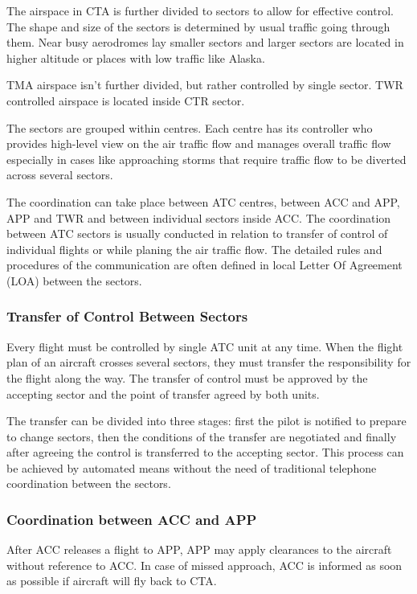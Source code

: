 The airspace in CTA is further divided to sectors to allow for effective control. The shape and size of the sectors is determined by usual traffic going through them. Near busy aerodromes lay smaller sectors and larger sectors are located in higher altitude or places with low traffic like Alaska.

TMA airspace isn't further divided, but rather controlled by single sector. TWR controlled airspace is located inside CTR sector. 

The sectors are grouped within centres. Each centre has its  controller who provides high-level view on the air traffic flow and manages overall traffic flow especially in cases like approaching storms that require traffic flow to be diverted across several sectors.

The coordination can take place between ATC centres, between ACC and APP, APP and TWR and between individual sectors inside ACC. The coordination between ATC sectors is usually conducted in relation to transfer of control of individual flights or while planing the air traffic flow. The detailed rules and procedures of the communication are often defined in local Letter Of Agreement (LOA) between the sectors.

\subsubsection{Transfer of Control Between Sectors}

Every flight must be controlled by single ATC unit at any time. When the flight plan of an aircraft crosses several sectors, they must transfer the responsibility for the flight along the way. The transfer of control must be approved by the accepting sector and the point of transfer agreed by both units.

The transfer can be divided into three stages: first the pilot is notified to prepare to change sectors, then the conditions of the transfer are negotiated and finally after agreeing the control is transferred to the accepting sector. This process can be achieved by automated means without the need of traditional telephone coordination between the sectors. \cite[Chapter 10]{doc4444}

\subsubsection{Coordination between ACC and APP}

After ACC releases a flight to APP, APP may apply clearances to the aircraft without reference to ACC. In case of missed approach, ACC is informed as soon as possible if aircraft will fly back to CTA.

